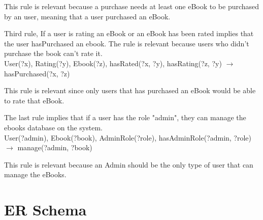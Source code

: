 \documentclass[a4paper,11pt]{article}
\begin{document}
This rule is relevant because a purchase needs at least one eBook to be purchased by an user, meaning
that a user purchased an eBook.

Third rule, If a user is rating an eBook or an eBook has been rated implies that the user hasPurchased an ebook.
The rule is relevant because users who didn't purchase the book can't rate it.\\

User(?x), Rating(?y), Ebook(?z), hasRated(?x, ?y), hasRating(?z, ?y) $\rightarrow$ hasPurchased(?x, ?z)

This rule is relevant since only users that has purchased an eBook would be able to rate that eBook.

The last rule implies that if a user has the role "admin", they can manage the ebooks database on the system.\\

User(?admin), Ebook(?book), AdminRole(?role), hasAdminRole(?admin, ?role) $\rightarrow$ manage(?admin, ?book)

This rule is relevant because an Admin should be the only type of user that can manage the eBooks.

\section{ER Schema}

\begin{center}
\end{center}
\end{document}
